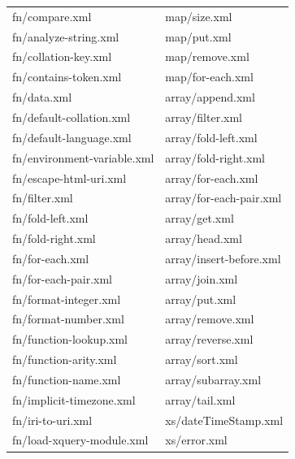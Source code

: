 \begin{table}
	\centering
	\begin{tabular}{|l|l|} 
		\hline
		fn/compare.xml                  & map/size.xml                       \\
		fn/analyze-string.xml           & map/put.xml                        \\
		fn/collation-key.xml            & map/remove.xml                     \\
		fn/contains-token.xml           & map/for-each.xml                   \\
		fn/data.xml                     & array/append.xml                   \\
		fn/default-collation.xml        & array/filter.xml                   \\
		fn/default-language.xml         & array/fold-left.xml                \\
		fn/environment-variable.xml     & array/fold-right.xml               \\
		fn/escape-html-uri.xml          & array/for-each.xml                 \\
		fn/filter.xml                   & array/for-each-pair.xml            \\
		fn/fold-left.xml                & array/get.xml                      \\
		fn/fold-right.xml               & array/head.xml                     \\
		fn/for-each.xml                 & array/insert-before.xml            \\
		fn/for-each-pair.xml            & array/join.xml                     \\
		fn/format-integer.xml           & array/put.xml                      \\
		fn/format-number.xml            & array/remove.xml                   \\
		fn/function-lookup.xml          & array/reverse.xml                  \\
		fn/function-arity.xml           & array/sort.xml                     \\
		fn/function-name.xml            & array/subarray.xml                 \\
		fn/implicit-timezone.xml        & array/tail.xml                     \\
		fn/iri-to-uri.xml               & xs/dateTimeStamp.xml               \\
		fn/load-xquery-module.xml       & xs/error.xml                       \\

\end{tabular}
\end{table}
